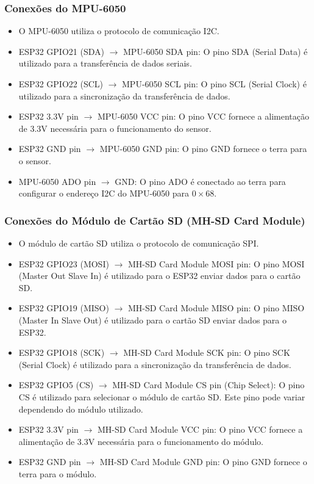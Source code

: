 \subsubsection{Conexões do MPU-6050}

\begin{itemize}
    \item O MPU-6050 utiliza o protocolo de comunicação I2C.
    \item ESP32 GPIO21 (SDA) $\rightarrow$ MPU-6050 SDA pin: O pino SDA (Serial Data) é utilizado para a transferência de dados seriais.
    \item ESP32 GPIO22 (SCL) $\rightarrow$ MPU-6050 SCL pin: O pino SCL (Serial Clock) é utilizado para a sincronização da transferência de dados.
    \item ESP32 3.3V pin $\rightarrow$ MPU-6050 VCC pin: O pino VCC fornece a alimentação de 3.3V necessária para o funcionamento do sensor.
    \item ESP32 GND pin $\rightarrow$ MPU-6050 GND pin: O pino GND fornece o terra para o sensor.
    \item MPU-6050 ADO pin $\rightarrow$ GND: O pino ADO é conectado ao terra para configurar o endereço I2C do MPU-6050 para $0\times68$.
\end{itemize}

\subsubsection{Conexões do Módulo de Cartão SD (MH-SD Card Module)}

\begin{itemize}
    \item O módulo de cartão SD utiliza o protocolo de comunicação SPI.
    \item ESP32 GPIO23 (MOSI) $\rightarrow$ MH-SD Card Module MOSI pin: O pino MOSI (Master Out Slave In) é utilizado para o ESP32 enviar dados para o cartão SD.
    \item ESP32 GPIO19 (MISO) $\rightarrow$ MH-SD Card Module MISO pin: O pino MISO (Master In Slave Out) é utilizado para o cartão SD enviar dados para o ESP32.
    \item ESP32 GPIO18 (SCK) $\rightarrow$ MH-SD Card Module SCK pin: O pino SCK (Serial Clock) é utilizado para a sincronização da transferência de dados.
    \item ESP32 GPIO5 (CS) $\rightarrow$ MH-SD Card Module CS pin (Chip Select): O pino CS é utilizado para selecionar o módulo de cartão SD. Este pino pode variar dependendo do módulo utilizado.
    \item ESP32 3.3V pin $\rightarrow$ MH-SD Card Module VCC pin: O pino VCC fornece a alimentação de 3.3V necessária para o funcionamento do módulo.
    \item ESP32 GND pin $\rightarrow$ MH-SD Card Module GND pin: O pino GND fornece o terra para o módulo.
\end{itemize}

